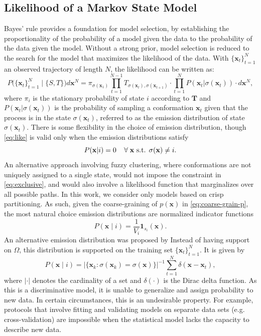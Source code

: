 \documentclass[journal=jpcbfk, layout=traditional, manuscript=article]{achemso}
\begin{document}
\subsection{Likelihood of a Markov State Model}
Bayes' rule provides a foundation for model selection, by establishing the proportionality of the probability of a model given the data to the probability of the data given the model. Without a strong prior, model selection is reduced to the search for the model that maximizes the likelihood of the data. 
With $\{\mathbf{x}_t\}_{t=1}^N$ an observed trajectory of length $N$, the likelihood can be written as:
\begin{equation}
P\big(\{\mathbf{x}_t\}_{t=1}^N\;\big|\; \{S, T\}\big)d\mathbf{x}^N = \pi_{\sigma(\mathbf{x}_1)}\prod_{t=1}^{N-1} T_{\sigma(\mathbf{x}_t), \sigma(\mathbf{x}_{t+1})} \cdot \prod_{t=1}^{N} P(\mathbf{x}_t | \sigma(\mathbf{x}_t)) \cdot d\mathbf{x}^N,
\label{eq:like}
\end{equation}
where $\pi_i$ is the stationary probability of state $i$ according to $\mathbf{T}$ and $P(\mathbf{x}_t | \sigma(\mathbf{x}_t))$ is the probability of sampling a conformation $\mathbf{x}_t$ given that the process is in the state $\sigma(\mathbf{x}_t)$, referred to as the emission distribution of state $\sigma(\mathbf{x}_t)$. There is some flexibility in the choice of emission distribution, though \cref{eq:like} is valid only when the emission distributions satisfy
\begin{equation}
\label{eq:exclusive}
P(\mathbf{x} | i) = 0 \;\;\;\; \forall \; \mathbf{x} \textnormal{ s.t. } \sigma(\mathbf{x}) \neq i.
\end{equation}
An alternative approach involving fuzzy clustering, where conformations are not uniquely assigned to a single state, would not impose the constraint in \cref{eq:exclusive}, and would also involve a likelihood function that marginalizes over all possible paths\cite{gordon1992fuzzy}. In this work, we consider only models based on crisp partitioning. As such, given the coarse-graining of $p(\mathbf{x})$ in \cref{eq:coarse-grain-p}, the most natural choice emission distributions are normalized indicator functions
\begin{equation}
P(\mathbf{x} \;|\; i) = \frac{1}{V_i} \mathbf{1}_{s_i}(\mathbf{x}).
\end{equation}
An alternative emission distribution was proposed by \citet{Kellogg2012Evaluation} Instead of having support on $\Omega$, this distribution is supported on the training set $\{\mathbf{x}_t\}_{t=1}^N$. It is given by
\begin{equation}
P(\mathbf{x} \;|\; i) = \big| \{ \mathbf{x}_k : \sigma(\mathbf{x}_k) = \sigma(\mathbf{x}) \} \big|^{-1} \sum_{t=1}^N \delta(\mathbf{x}-\mathbf{x}_t),
\end{equation} where $| \cdot |$ denotes the cardinality of a set and $\delta(\cdot)$ is the Dirac delta function. As this is a discriminative model, it is unable to generalize and assign probability to new data. In certain circumstances, this is an undesirable property. For example, protocols that involve fitting and validating models on separate data sets (e.g. cross-validation) are impossible when the statistical model lacks the capacity to describe new data.
\end{document}
